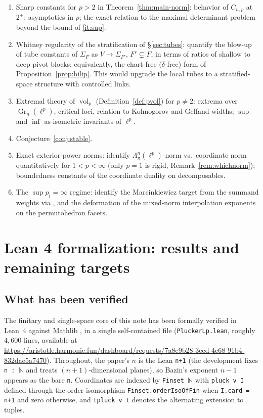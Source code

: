 \documentclass[11pt]{amsart}
\theoremstyle{definition}
\newcommand{\N}{\mathbb{N}}
\newcommand{\Gr}{\operatorname{Gr}}
\newcommand{\vol}{\operatorname{vol}}
\begin{document}
\begin{enumerate}[label=\textbf{P\arabic*.},leftmargin=2.6em]
\item\label{prob:const} Sharp constants for $p>2$ in Theorem~\ref{thm:main-norm}: behavior of $C_{n,p}$ at $2^+$; asymptotics in $p$; the exact relation to the maximal determinant problem beyond the bound of \ref{it:sup}.
\item\label{prob:whitney} Whitney regularity of the stratification of \S\ref{sec:tubes}: quantify the blow-up of tube constants of $\Sigma_F$ as $V\to\Sigma_{F'}$, $F'\subsetneq F$, in terms of ratios of shallow to deep pivot blocks; equivalently, the chart-free ($\delta$-free) form of Proposition~\ref{prop:bilip}. This would upgrade the local tubes to a stratified-space structure with controlled links.
\item\label{prob:vol} Extremal theory of $\vol_p$ (Definition~\ref{def:pvol}) for $p\ne2$: extrema over $\Gr_n(\ell^p)$, critical loci, relation to Kolmogorov and Gelfand widths; $\sup$ and $\inf$ as isometric invariants of $\ell^p$.
\item Conjecture~\ref{conj:stable}.
\item Exact exterior-power norms: identify $\Lambda_\pi^n(\ell^p)$-norm vs.\ coordinate norm quantitatively for $1<p<\infty$ (only $p=1$ is rigid, Remark~\ref{rem:whichnorm}); boundedness constants of the coordinate duality on decomposables.
\item The $\sup p_i=\infty$ regime: identify the Marcinkiewicz target from the summand weights via \cite{Cal,Loz}, and the deformation of the mixed-norm interpolation exponents on the permutohedron facets.
\end{enumerate}

\section{Lean 4 formalization: results and remaining targets}\label{sec:lean}

\subsection*{What has been verified}
The finitary and single-space core of this note has been formally verified in Lean~4 against Mathlib \cite{mathlib}, in a single self-contained file (\texttt{PluckerLp.lean}, roughly $4{,}600$ lines, available at \url{https://aristotle.harmonic.fun/dashboard/requests/7a8e9b28-3eed-4c68-91b4-832dae5a7470}). Throughout, the paper's $n$ is the Lean \texttt{n+1} (the development fixes \texttt{n :\ $\N$} and treats $(n{+}1)$-dimensional planes), so Bazin's exponent $n-1$ appears as the bare \texttt{n}. Coordinates are indexed by \texttt{Finset $\N$} with \texttt{pluck v I} defined through the order isomorphism \texttt{Finset.orderIsoOfFin} when \texttt{I.card = n+1} and zero otherwise, and \texttt{tpluck v t} denotes the alternating extension to tuples.
\end{document}
